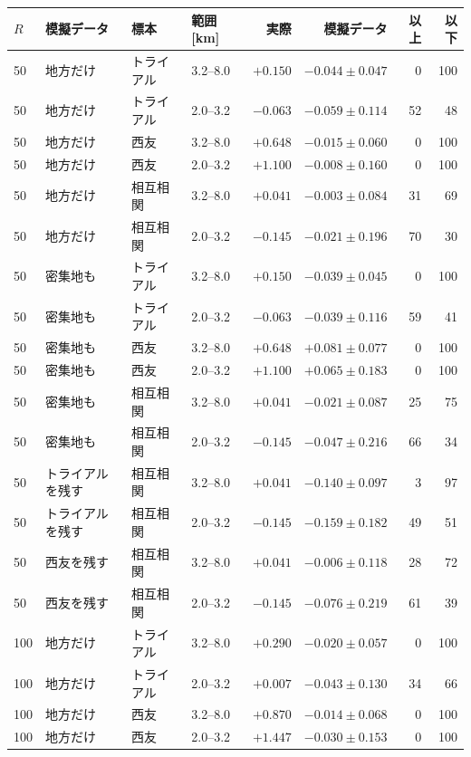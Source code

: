 \begin{tabular}{llllrrrr}
\toprule
$R$ & 模擬データ & 標本 & 範囲 [km] & 実際 & 模擬データ & 以上 & 以下 \\
\midrule
50 & 地方だけ & トライアル & 3.2--8.0 & $+0.150$ & $-0.044 \pm 0.047$ & 0 & 100 \\
50 & 地方だけ & トライアル & 2.0--3.2 & $-0.063$ & $-0.059 \pm 0.114$ & 52 & 48 \\
50 & 地方だけ & 西友 & 3.2--8.0 & $+0.648$ & $-0.015 \pm 0.060$ & 0 & 100 \\
50 & 地方だけ & 西友 & 2.0--3.2 & $+1.100$ & $-0.008 \pm 0.160$ & 0 & 100 \\
50 & 地方だけ & 相互相関 & 3.2--8.0 & $+0.041$ & $-0.003 \pm 0.084$ & 31 & 69 \\
50 & 地方だけ & 相互相関 & 2.0--3.2 & $-0.145$ & $-0.021 \pm 0.196$ & 70 & 30 \\
50 & 密集地も & トライアル & 3.2--8.0 & $+0.150$ & $-0.039 \pm 0.045$ & 0 & 100 \\
50 & 密集地も & トライアル & 2.0--3.2 & $-0.063$ & $-0.039 \pm 0.116$ & 59 & 41 \\
50 & 密集地も & 西友 & 3.2--8.0 & $+0.648$ & $+0.081 \pm 0.077$ & 0 & 100 \\
50 & 密集地も & 西友 & 2.0--3.2 & $+1.100$ & $+0.065 \pm 0.183$ & 0 & 100 \\
50 & 密集地も & 相互相関 & 3.2--8.0 & $+0.041$ & $-0.021 \pm 0.087$ & 25 & 75 \\
50 & 密集地も & 相互相関 & 2.0--3.2 & $-0.145$ & $-0.047 \pm 0.216$ & 66 & 34 \\
50 & トライアルを残す & 相互相関 & 3.2--8.0 & $+0.041$ & $-0.140 \pm 0.097$ & 3 & 97 \\
50 & トライアルを残す & 相互相関 & 2.0--3.2 & $-0.145$ & $-0.159 \pm 0.182$ & 49 & 51 \\
50 & 西友を残す & 相互相関 & 3.2--8.0 & $+0.041$ & $-0.006 \pm 0.118$ & 28 & 72 \\
50 & 西友を残す & 相互相関 & 2.0--3.2 & $-0.145$ & $-0.076 \pm 0.219$ & 61 & 39 \\
\midrule
100 & 地方だけ & トライアル & 3.2--8.0 & $+0.290$ & $-0.020 \pm 0.057$ & 0 & 100 \\
100 & 地方だけ & トライアル & 2.0--3.2 & $+0.007$ & $-0.043 \pm 0.130$ & 34 & 66 \\
100 & 地方だけ & 西友 & 3.2--8.0 & $+0.870$ & $-0.014 \pm 0.068$ & 0 & 100 \\
100 & 地方だけ & 西友 & 2.0--3.2 & $+1.447$ & $-0.030 \pm 0.153$ & 0 & 100 \\

\end{tabular}
